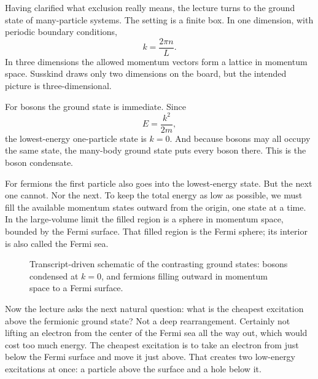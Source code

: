 Having clarified what exclusion really means, the lecture turns to the ground state of many-particle systems. The setting is a finite box. In one dimension, with periodic boundary conditions,
\begin{equation}
k=\frac{2\pi n}{L}.
\end{equation}
In three dimensions the allowed momentum vectors form a lattice in momentum space. Susskind draws only two dimensions on the board, but the intended picture is three-dimensional.

For bosons the ground state is immediate. Since
\begin{equation}
E=\frac{k^2}{2m},
\end{equation}
the lowest-energy one-particle state is \(k=0\). And because bosons may all occupy the same state, the many-body ground state puts every boson there. This is the boson condensate.

For fermions the first particle also goes into the lowest-energy state. But the next one cannot. Nor the next. To keep the total energy as low as possible, we must fill the available momentum states outward from the origin, one state at a time. In the large-volume limit the filled region is a sphere in momentum space, bounded by the Fermi surface. That filled region is the Fermi sphere; its interior is also called the Fermi sea.

\begin{figure}
\centering
{}
\caption{Transcript-driven schematic of the contrasting ground states: bosons condensed at \(k=0\), and fermions filling outward in momentum space to a Fermi surface.}
\end{figure}

Now the lecture asks the next natural question: what is the cheapest excitation above the fermionic ground state? Not a deep rearrangement. Certainly not lifting an electron from the center of the Fermi sea all the way out, which would cost too much energy. The cheapest excitation is to take an electron from just below the Fermi surface and move it just above. That creates two low-energy excitations at once: a particle above the surface and a hole below it.

